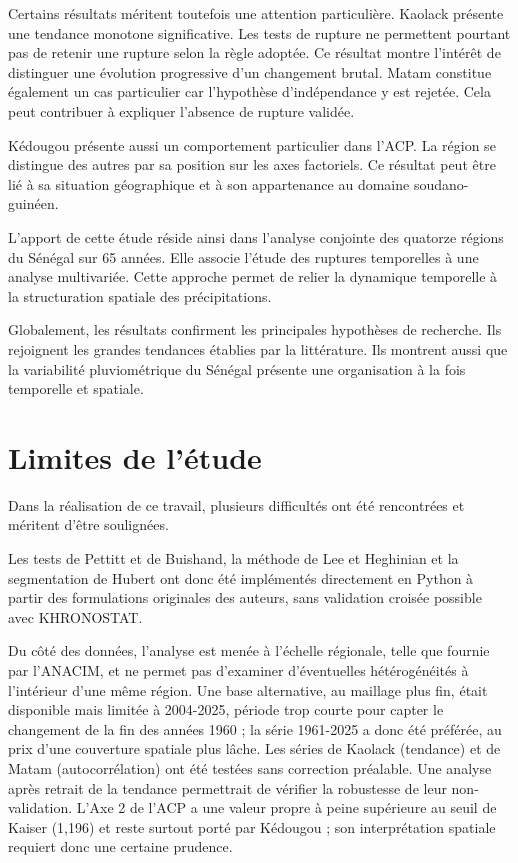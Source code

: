 \documentclass[12pt,a4paper]{report}
\begin{document}
Certains résultats méritent toutefois une attention particulière. Kaolack présente une tendance monotone significative. Les tests de rupture ne permettent pourtant pas de retenir une rupture selon la règle adoptée. Ce résultat montre l’intérêt de distinguer une évolution progressive d’un changement brutal. Matam constitue également un cas particulier car l’hypothèse d’indépendance y est rejetée. Cela peut contribuer à expliquer l’absence de rupture validée.

Kédougou présente aussi un comportement particulier dans l’ACP. La région se distingue des autres par sa position sur les axes factoriels. Ce résultat peut être lié à sa situation géographique et à son appartenance au domaine soudano-guinéen.

L’apport de cette étude réside ainsi dans l’analyse conjointe des quatorze régions du Sénégal sur 65 années. Elle associe l’étude des ruptures temporelles à une analyse multivariée. Cette approche permet de relier la dynamique temporelle à la structuration spatiale des précipitations.

Globalement, les résultats confirment les principales hypothèses de recherche. Ils rejoignent les grandes tendances établies par la littérature. Ils montrent aussi que la variabilité pluviométrique du Sénégal présente une organisation à la fois temporelle et spatiale.

\section{Limites de l'étude}

Dans la réalisation de ce travail, plusieurs difficultés ont été rencontrées et méritent d'être soulignées.

Les tests de Pettitt et de Buishand, la méthode de Lee et Heghinian et la segmentation de Hubert ont donc été implémentés directement en Python à partir des formulations originales des auteurs, sans validation croisée possible avec KHRONOSTAT.

Du côté des données, l’analyse est menée à l’échelle régionale, telle que fournie par l’ANACIM, et ne permet pas d’examiner d’éventuelles hétérogénéités à l’intérieur d’une même région. Une base alternative, au maillage plus fin, était disponible mais limitée à 2004-2025, période trop courte pour capter le changement de la fin des années 1960 ; la série 1961-2025 a donc été préférée, au prix d’une couverture spatiale plus lâche. Les séries de Kaolack (tendance) et de Matam (autocorrélation) ont été testées sans correction préalable. Une analyse après retrait de la tendance permettrait de vérifier la robustesse de leur non-validation. L’Axe 2 de l’ACP a une valeur propre à peine supérieure au seuil de Kaiser (1,196) et reste surtout porté par Kédougou ; son interprétation spatiale requiert donc une certaine prudence.
\end{document}

